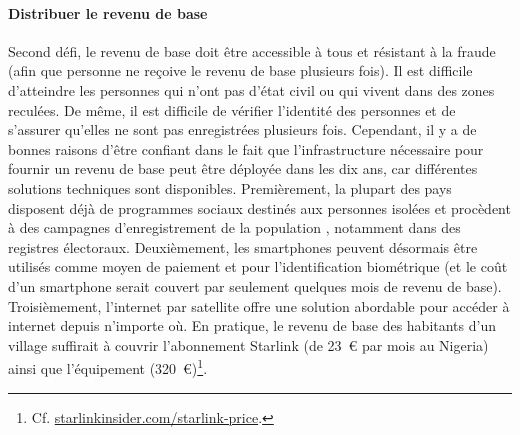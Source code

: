 \documentclass[a5paper,french,openany]{memoir}
\begin{document}
\paragraph{Distribuer le revenu de base}
Second défi, le revenu de base doit être accessible à tous et résistant à la fraude (afin que personne ne reçoive le revenu de base plusieurs fois). Il est difficile d'atteindre les personnes qui n'ont pas d'état civil ou qui vivent dans des zones reculées. De même, il est difficile de vérifier l'identité des personnes et de s'assurer qu'elles ne sont pas enregistrées plusieurs fois. Cependant, il y a de bonnes raisons d'être confiant dans le fait que l'infrastructure nécessaire pour fournir un revenu de base peut être déployée dans les dix ans, car différentes solutions techniques sont disponibles. Premièrement, la plupart des pays disposent déjà de programmes sociaux destinés aux personnes isolées et procèdent à des campagnes d'enregistrement de la population%
, notamment dans des registres électoraux. %
Deuxièmement, les smartphones peuvent désormais être utilisés comme moyen de paiement et pour l'identification biométrique (et le coût d'un smartphone serait couvert par seulement quelques mois de revenu de base). %
Troisièmement, %
l'internet par satellite offre une solution abordable pour accéder à internet depuis n'importe où. En pratique, le revenu de base des habitants d'un village suffirait à couvrir l'abonnement Starlink (de 23~\euro{} par mois au Nigeria) ainsi que l'équipement (320~\euro{})\footnote{Cf. \href{https://starlinkinsider.com/starlink-price/}{starlinkinsider.com/starlink-price}.}. %
\end{document}
